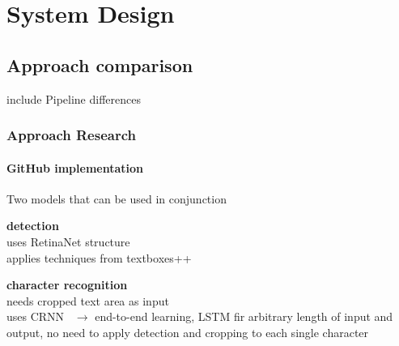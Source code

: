 \chapter{System Design}
\section{Approach comparison}
include Pipeline differences


\subsection{Approach Research}
\subsubsection*{GitHub implementation}
Two models that can be used in conjunction

\textbf{detection}~\cite{beom_text_2021}\\
uses RetinaNet structure~\cite{lin_focal_2018}\\
applies techniques from textboxes++~\cite{liao_textboxes_2018}

\textbf{character recognition}~\cite{beom_crnn_2021}\\
needs cropped text area as input\\
uses CRNN~\cite{shi_end--end_2015} $\rightarrow$ end-to-end learning, LSTM fir arbitrary length of
input and output, no need to apply detection and cropping to each single character

